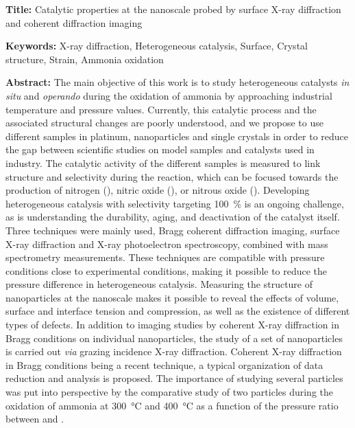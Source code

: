 \begin{mdframed}[linecolor=Prune,linewidth=1]

\textbf{Title:} Catalytic properties at the nanoscale probed by surface X-ray diffraction and coherent diffraction imaging

\noindent \textbf{Keywords:} X-ray diffraction, Heterogeneous catalysis, Surface, Crystal structure, Strain, Ammonia oxidation

\vspace{-.5cm}
\begin{multicols}{2}
\noindent \textbf{Abstract:}
The main objective of this work is to study heterogeneous catalysts \textit{in situ} and \textit{operando} during the oxidation of ammonia by approaching industrial temperature and pressure values.
Currently, this catalytic process and the associated structural changes are poorly understood, and we propose to use different samples in platinum, nanoparticles and single crystals in order to reduce the gap between scientific studies on model samples and catalysts used in industry.
The catalytic activity of the different samples is measured to link structure and selectivity during the reaction, which can be focused towards the production of nitrogen (), nitric oxide (), or nitrous oxide ().
Developing heterogeneous catalysis with selectivity targeting \qty{100}{\percent} is an ongoing challenge, as is understanding the durability, aging, and deactivation of the catalyst itself.
Three techniques were mainly used, Bragg coherent diffraction imaging, surface X-ray diffraction and X-ray photoelectron spectroscopy, combined with mass spectrometry measurements.
These techniques are compatible with pressure conditions close to experimental conditions, making it possible to reduce the pressure difference in heterogeneous catalysis.
Measuring the structure of nanoparticles at the nanoscale makes it possible to reveal the effects of volume, surface and interface tension and compression, as well as the existence of different types of defects.
In addition to imaging studies by coherent X-ray diffraction in Bragg conditions on individual nanoparticles, the study of a set of nanoparticles is carried out \textit{via} grazing incidence X-ray diffraction.
Coherent X-ray diffraction in Bragg conditions being a recent technique, a typical organization of data reduction and analysis is proposed.
The importance of studying several particles was put into perspective by the comparative study of two particles during the oxidation of ammonia at \qty{300}{\degreeCelsius} and \qty{400}{\degreeCelsius} as a function of the pressure ratio between  and .

\end{multicols}
\end{mdframed}
